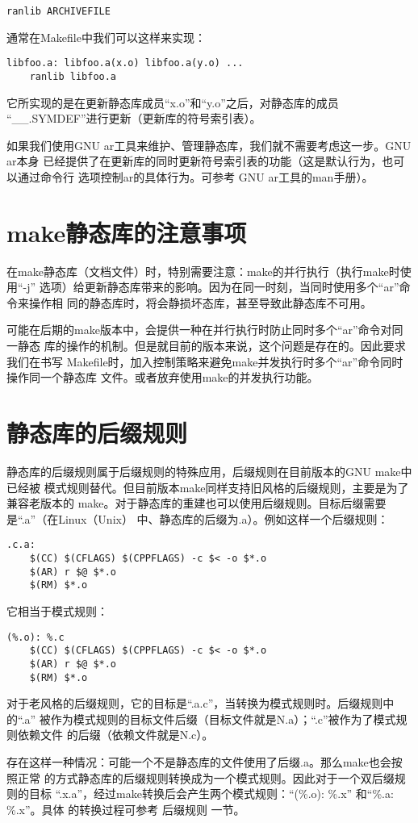 \begin{Verbatim}[]
ranlib ARCHIVEFILE
\end{Verbatim}

通常在Makefile中我们可以这样来实现：
\begin{Verbatim}[]
libfoo.a: libfoo.a(x.o) libfoo.a(y.o) ...
    ranlib libfoo.a
\end{Verbatim}
\noindent 它所实现的是在更新静态库成员“x.o”和“y.o”之后，对静态库的成员
“\_\_.SYMDEF”进行更新（更新库的符号索引表）。

如果我们使用GNU ar工具来维护、管理静态库，我们就不需要考虑这一步。GNU ar本身
已经提供了在更新库的同时更新符号索引表的功能（这是默认行为，也可以通过命令行
选项控制ar的具体行为。可参考 GNU ar工具的man手册）。

\section{make静态库的注意事项}

在make静态库（文档文件）时，特别需要注意：make的并行执行（执行make时使用“-j”
选项）给更新静态库带来的影响。因为在同一时刻，当同时使用多个“ar”命令来操作相
同的静态库时，将会静损坏态库，甚至导致此静态库不可用。

可能在后期的make版本中，会提供一种在并行执行时防止同时多个“ar”命令对同一静态
库的操作的机制。但是就目前的版本来说，这个问题是存在的。因此要求我们在书写
Makefile时，加入控制策略来避免make并发执行时多个“ar”命令同时操作同一个静态库
文件。或者放弃使用make的并发执行功能。

\section{静态库的后缀规则}
静态库的后缀规则属于后缀规则的特殊应用，后缀规则在目前版本的GNU make中已经被
模式规则替代。但目前版本make同样支持旧风格的后缀规则，主要是为了兼容老版本的
make。对于静态库的重建也可以使用后缀规则。目标后缀需要是“.a”（在Linux（Unix）
中、静态库的后缀为.a）。例如这样一个后缀规则：

\begin{Verbatim}[]
.c.a:
    $(CC) $(CFLAGS) $(CPPFLAGS) -c $< -o $*.o
    $(AR) r $@ $*.o
    $(RM) $*.o
\end{Verbatim}

它相当于模式规则：

\begin{Verbatim}[]
(%.o): %.c
    $(CC) $(CFLAGS) $(CPPFLAGS) -c $< -o $*.o
    $(AR) r $@ $*.o
    $(RM) $*.o
\end{Verbatim}

对于老风格的后缀规则，它的目标是“.a.c”，当转换为模式规则时。后缀规则中的“.a”
被作为模式规则的目标文件后缀（目标文件就是N.a）；“.c”被作为了模式规则依赖文件
的后缀（依赖文件就是N.c）。

存在这样一种情况：可能一个不是静态库的文件使用了后缀.a。那么make也会按照正常
的方式静态库的后缀规则转换成为一个模式规则。因此对于一个双后缀规则的目标
“.x.a”，经过make转换后会产生两个模式规则：“(\%.o): \%.x” 和“\%.a: \%.x”。具体
的转换过程可参考 后缀规则 一节。
